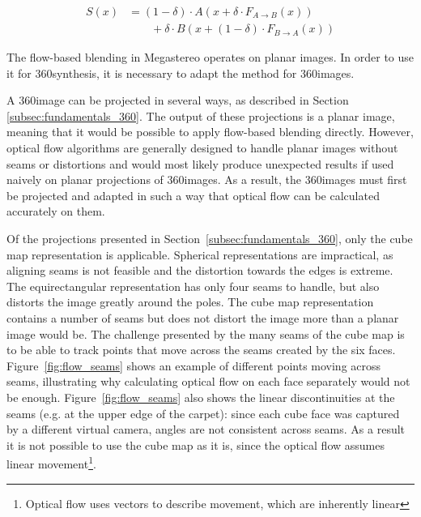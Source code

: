 \begin{align}
S(x) &= (1-\delta ) \cdot A( x + \delta \cdot F_{A\to B}(x)) \nonumber\\
     &\qquad {} + \delta \cdot B( x + (1-\delta) \cdot F_{B\to A}(x)) \label{eq:flow_blending}
   \end{align}

The flow-based blending in Megastereo operates on planar images. In order to use it for 360\degree synthesis, it is necessary to adapt the method for 360\degree images.

A 360\degree image can be projected in several ways, as described in Section \ref{subsec:fundamentals_360}. The output of these projections is a planar image, meaning that it would be possible to apply flow-based blending directly. However, optical flow algorithms are generally designed to handle planar images without seams or distortions and would most likely produce unexpected results if used naively on planar projections of 360\degree images. As a result, the 360\degree images must first be projected and adapted in such a way that optical flow can be calculated accurately on them.


Of the projections presented in Section~\ref{subsec:fundamentals_360}, only the cube map representation is applicable. Spherical representations are impractical, as aligning seams is not feasible and the distortion towards the edges is extreme. The equirectangular representation has only four seams to handle, but also distorts the image greatly around the poles. The cube map representation contains a number of seams but does not distort the image more than a planar image would be. 
The challenge presented by the many seams of the cube map is to be able to track points that move across the seams created by the six faces. Figure~\ref{fig:flow_seams} shows an example of different points moving across seams, illustrating why calculating optical flow on each face separately would not be enough. Figure~\ref{fig:flow_seams} also shows the linear discontinuities at the seams (e.g. at the upper edge of the carpet): since each cube face was captured by a different virtual camera, angles are not consistent across seams. As a result it is not possible to use the cube map as it is, since the optical flow assumes linear movement\footnote{Optical flow uses vectors to describe movement, which are inherently linear}.

